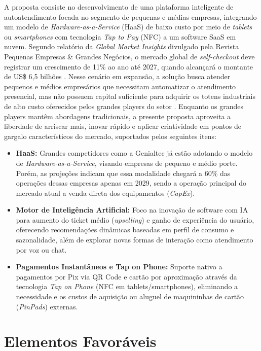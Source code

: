 \documentclass[a4paper]{article}
\begin{document}
A proposta consiste no desenvolvimento de uma plataforma inteligente de autoatendimento focada no segmento de pequenas e médias empresas, integrando um modelo de \textit{Hardware-as-a-Service} (HaaS) de baixo custo por meio de \textit{tablets} ou \textit{smartphones} com tecnologia \textit{Tap to Pay} (NFC) a um software SaaS em nuvem. Segundo relatório da \textit{Global Market Insights} divulgado pela Revista Pequenas Empresas \& Grandes Negócios, o mercado global de \textit{self-checkout} deve registrar um crescimento de 11\% ao ano até 2027, quando alcançará o montante de US\$ 6,5 bilhões \cite{pegn2026}. Nesse cenário em expansão, a solução busca atender pequenos e médios empresários que necessitam automatizar o atendimento presencial, mas não possuem capital suficiente para adquirir os totens industriais de alto custo oferecidos pelos grandes players do setor \cite{genialtec2026}. Enquanto os grandes players mantêm abordagens tradicionais, a presente proposta aproveita a liberdade de arriscar mais, inovar rápido e aplicar criatividade em pontos de gargalo característicos do mercado, suportados pelos seguintes itens:

\begin{itemize}
    \item \textbf{HaaS:} Grandes competidores como a Genialtec já estão adotando o modelo de \textit{Hardware-as-a-Service}, visando empresas de pequeno e médio porte. Porém, as projeções indicam que essa modalidade chegará a 60\% das operações dessas empresas apenas em 2029, sendo a operação principal do mercado atual a venda direta dos equipamentos (\textit{CapEx}).
    \item \textbf{Motor de Inteligência Artificial:} Foco na inovação de software com IA para aumento do ticket médio (\textit{upselling}) e ganho de experiência do usuário, oferecendo recomendações dinâmicas baseadas em perfil de consumo e sazonalidade, além de explorar novas formas de interação como atendimento por voz ou chat.
    \item \textbf{Pagamentos Instantâneos e Tap on Phone:} Suporte nativo a pagamentos por Pix via QR Code e cartão por aproximação através da tecnologia \textit{Tap on Phone} (NFC em tablets/smartphones), eliminando a necessidade e os custos de aquisição ou aluguel de maquininhas de cartão (\textit{PinPads}) externas.
\end{itemize}

\section{Elementos Favoráveis}
\end{document}
